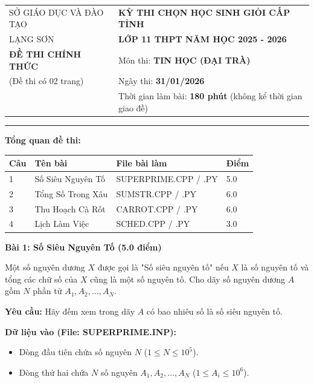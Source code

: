 \documentclass[11pt, a4paper]{article}
\newcommand{\bai}[2]{\vspace{0.5cm}\noindent\textbf{Bài #1: #2}}
\begin{document}
\begin{center}
    \begin{tabular}{>{\centering\arraybackslash}p{} >{\centering\arraybackslash}p{}}
        SỞ GIÁO DỤC VÀ ĐÀO TẠO & \textbf{KỲ THI CHỌN HỌC SINH GIỎI CẤP TỈNH} \\
        LẠNG SƠN & \textbf{LỚP 11 THPT NĂM HỌC 2025 - 2026} \\
        \textbf{ĐỀ THI CHÍNH THỨC} & Môn thi: \textbf{TIN HỌC (ĐẠI TRÀ)} \\
        (Đề thi có 02 trang) & Ngày thi: \textbf{31/01/2026} \\
         & Thời gian làm bài: \textbf{180 phút} (không kể thời gian giao đề)
    \end{tabular}
\end{center}
\hrule
\vspace{0.5cm}

\textbf{Tổng quan đề thi:}
\begin{center}
\begin{tabular}{|l|l|l|l|}
\hline
\textbf{Câu} & \textbf{Tên bài} & \textbf{File bài làm} & \textbf{Điểm} \\ \hline
1 & Số Siêu Nguyên Tố & SUPERPRIME.CPP / .PY & 5.0 \\ \hline
2 & Tổng Số Trong Xâu & SUMSTR.CPP / .PY & 6.0 \\ \hline
3 & Thu Hoạch Cà Rốt & CARROT.CPP / .PY & 6.0 \\ \hline
4 & Lịch Làm Việc & SCHED.CPP / .PY & 3.0 \\ \hline
\end{tabular}
\end{center}

\vspace{0.5cm}

\bai{1}{Số Siêu Nguyên Tố (5.0 điểm)}

Một số nguyên dương $X$ được gọi là "Số siêu nguyên tố" nếu $X$ là số nguyên tố và tổng các chữ số của $X$ cũng là một số nguyên tố.
Cho dãy số nguyên dương $A$ gồm $N$ phần tử $A_1, A_2, \dots, A_N$.

\textbf{Yêu cầu:} Hãy đếm xem trong dãy $A$ có bao nhiêu số là số siêu nguyên tố.

\textbf{Dữ liệu vào (File: SUPERPRIME.INP):}
\begin{itemize}
    \item Dòng đầu tiên chứa số nguyên $N$ ($1 \le N \le 10^5$).
    \item Dòng thứ hai chứa $N$ số nguyên $A_1, A_2, \dots, A_N$ ($1 \le A_i \le 10^6$).
\end{itemize}
\end{document}

